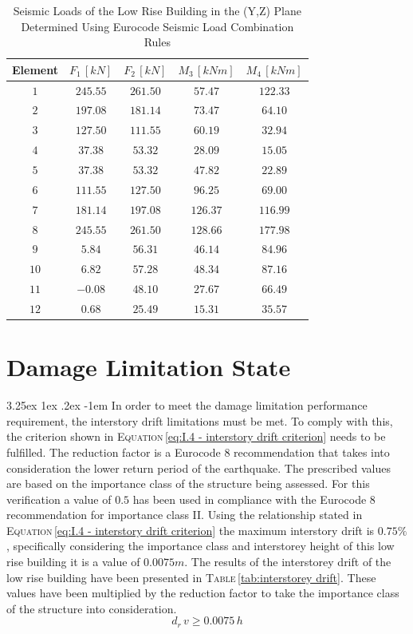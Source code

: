 \documentclass[11pt,a4paper,titlepage]{report}
\makeatletter
\renewcommand\paragraph{\@startsection{paragraph}{5}{\z@}%
  {3.25ex \@plus1ex \@minus.2ex}%
  {-1em}%
  {\normalfont\normalsize\bfseries}}
\makeatother
\begin{document}
\begin{table}[h]
    \centering
    \begin{tabular}{c|c|c|c|c}
    Element & $F_1 \,[kN]$ & $F_2 \,[kN]$ & $M_3\, [kNm]$ & $M_4 \,[kNm]$  \\
         \hline
    $1$ & $245.55 $ & $261.50$ & $57.47 $ & $122.33$ \\
    $2$ & $197.08$ & $181.14$ & $73.47$ & $64.10$ \\
    $3$ & $127.50$ & $111.55$ & $60.19$ & $32.94$ \\
    $4$ & $37.38$ & $53.32$ & $28.09$ & $15.05$ \\
    $5$ & $37.38 $ & $53.32$ & $47.82$ & $22.89$ \\
    $6$ & $111.55$ & $127.50$ & $96.25$ & $69.00$ \\
    $7$ & $181.14 $ & $197.08$ & $126.37$ & $116.99$ \\
    $8$ & $245.55$ & $261.50 $ & $128.66$ & $177.98$ \\
    $9$ & $5.84$ & $56.31$ & $46.14$ & $84.96$ \\
    $10$ & $6.82$ & $57.28 $ & $48.34 $ & $87.16$ \\
    $11$ & $-0.08$ & $48.10$ & $27.67$ & $66.49$ \\
    $12$ & $0.68$ & $25.49$ & $15.31$ & $35.57$ \\
    \end{tabular}
    \caption{Seismic Loads of the Low Rise Building in the (Y,Z) Plane Determined Using Eurocode Seismic Load Combination Rules}
    \label{tab:EC seimic load y}
\end{table}
\section{Damage Limitation State}
\paragraph{}In order to meet the damage limitation performance requirement, the interstory drift limitations must be met. To comply with this, the criterion shown in \textsc{Equation}\,\eqref{eq:I.4 - interstory drift criterion} needs to be fulfilled. The reduction factor is a Eurocode 8 recommendation that takes into consideration the lower return period of the earthquake. The prescribed values are based on the importance class of the structure being assessed. For this verification a value of $0.5$ has been used in compliance with the Eurocode 8 recommendation for importance class II. Using the relationship stated in \textsc{Equation}\,\eqref{eq:I.4 - interstory drift criterion} the maximum interstory drift is $0.75\%$, specifically considering the importance class and interstorey height of this low rise building it is a value of $0.0075m$. The results of the interstorey drift of the low rise building have been presented in \textsc{Table}\,\ref{tab:interstorey drift}. These values have been multiplied by the reduction factor to take the importance class of the structure into consideration.
\begin{equation}
    d_r\,v\geq0.0075\,h
    \label{eq:I.4 - interstory drift criterion}
\end{equation}
\end{document}
